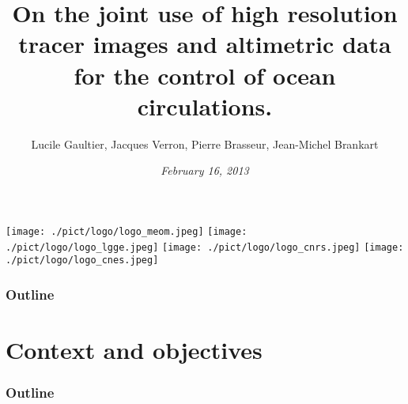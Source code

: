 \documentclass[compress,slidescentered,notes=show]{beamer}
\title{On the joint use of high resolution tracer images \hspace{4cm} and altimetric data for the control of ocean circulations.}
\author[LPO]{Lucile Gaultier, Jacques Verron, Pierre Brasseur, Jean-Michel Brankart}
\date{\textit{February 16, 2013}}
\begin{document}
\begin{frame}
  \maketitle
{}
  \begin{center}
    \texttt{[image: ./pict/logo/logo\_meom.jpeg]}
    \hspace{0.5cm}
    \texttt{[image: ./pict/logo/logo\_lgge.jpeg]}
    \hspace{0.5cm}
    \texttt{[image: ./pict/logo/logo\_cnrs.jpeg]}
    \hspace{0.5cm}
    \texttt{[image: ./pict/logo/logo\_cnes.jpeg]}
  \end{center}

  \note{
}
\end{frame}

\logo{\insertframenumber/\inserttotalframenumber}
\begin{frame}
  \frametitle{Outline}
  \tableofcontents
\end{frame}

\section{Context and objectives}
\begin{frame}
  \frametitle{Outline}
  \tableofcontents[currentsection]
\end{frame}
\end{document}
